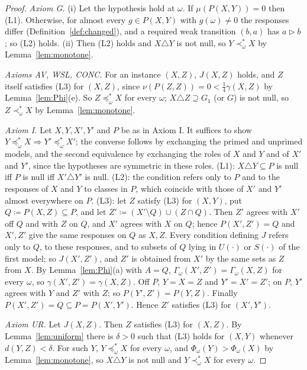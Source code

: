\documentclass[11pt]{article}
\theoremstyle{definition}
\begin{document}
\begin{proof}
\emph{Axiom G.} (i) Let the hypothesis hold at $\omega$. If $\mu(P(X,Y))=0$ then (L1). Otherwise, for almost every $g\in P(X,Y)$ with $g(\omega)\ne0$ the responses differ (Definition~\ref{def:changed}), and a required weak transition $(b,a)$ has $a\rhd b$; so (L2) holds. (ii) Then (L2) holds and $X\triangle Y$ is not null, so $Y\prec^\ast_\omega X$ by Lemma~\ref{lem:monotone}.

\emph{Axioms AV, WSL, CONC.} For an instance $(X,Z)$, $J(X,Z)$ holds, and $Z$ itself satisfies (L3) for $(X,Z)$, since $\nu(P(Z,Z))=0<\frac14\gamma(X,Z)$ by Lemma~\ref{lem:Phi}(e). So $Z\preceq^\ast_\omega X$ for every $\omega$; $X\triangle Z\supseteq G_1$ (or $G$) is not null, so $Z\prec^\ast_\omega X$ by Lemma~\ref{lem:monotone}.

\emph{Axiom I.} Let $X,Y,X',Y'$ and $P$ be as in Axiom I. It suffices to show $Y\preceq^\ast_\omega X\Rightarrow Y'\preceq^\ast_\omega X'$; the converse follows by exchanging the primed and unprimed models, and the second equivalence by exchanging the roles of $X$ and $Y$ and of $X'$ and $Y'$, since the hypotheses are symmetric in these roles. (L1): $X\triangle Y\subseteq P$ is null iff $P$ is null iff $X'\triangle Y'$ is null. (L2): the condition refers only to $P$ and to the responses of $X$ and $Y$ to classes in $P$, which coincide with those of $X'$ and $Y'$ almost everywhere on $P$. (L3): let $Z$ satisfy (L3) for $(X,Y)$, put $Q\coloneqq P(X,Z)\subseteq P$, and let $Z'\coloneqq(X'\setminus Q)\cup(Z\cap Q)$. Then $Z'$ agrees with $X'$ off $Q$ and with $Z$ on $Q$, and $X'$ agrees with $X$ on $Q$; hence $P(X',Z')=Q$ and $X',Z'$ give the same responses on $Q$ as $X,Z$. Every condition defining $J$ refers only to $Q$, to these responses, and to subsets of $Q$ lying in $U(\cdot)$ or $S(\cdot)$ of the first model; so $J(X',Z')$, and $Z'$ is obtained from $X'$ by the same sets as $Z$ from $X$. By Lemma~\ref{lem:Phi}(a) with $A=Q$, $\Gamma_\omega(X',Z')=\Gamma_\omega(X,Z)$ for every $\omega$, so $\gamma(X',Z')=\gamma(X,Z)$. Off $P$, $Y=X=Z$ and $Y'=X'=Z'$; on $P$, $Y'$ agrees with $Y$ and $Z'$ with $Z$; so $P(Y',Z')=P(Y,Z)$. Finally $P(X',Z')=Q\subseteq P=P(X',Y')$. Hence $Z'$ satisfies (L3) for $(X',Y')$.

\emph{Axiom UR.} Let $J(X,Z)$. Then $Z$ satisfies (L3) for $(X,Z)$. By Lemma~\ref{lem:uniform} there is $\delta>0$ such that (L3) holds for $(X,Y)$ whenever $d(Y,Z)<\delta$. For such $Y$, $Y\preceq^\ast_\omega X$ for every $\omega$, and $\Phi_\omega(Y)>\Phi_\omega(X)$ by Lemma~\ref{lem:monotone}, so $X\triangle Y$ is not null and $Y\prec^\ast_\omega X$ for every $\omega$.
\end{proof}
\end{document}
